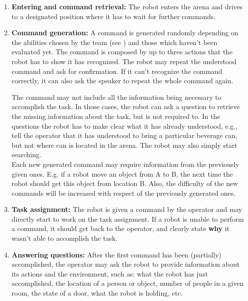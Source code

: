 \begin{enumerate}
	\item \textbf{Entering and command retrieval:} The robot enters the arena and drives to a designated position where it has to wait for further commands. \\

	\item \textbf{Command generation:} A command is generated randomly depending on the abilities chosen by the team (see ) and those which haven't been evaluated yet. The command is composed by up to three actions that the robot has to show it has recognized. The robot may repeat the understood command and ask for confirmation. If it can't recognize the command correctly, it can also ask the speaker to repeat the whole command again.

	The command may not include all the information being necessary to accomplish the task. In those cases, the robot can ask a question to retrieve the missing information about the task, but is not required to. In the questions the robot has to make clear what it has already understood, e.g., tell the operator that it has understood to bring a particular beverage can, but not where can is located in the arena. The robot may also simply start searching. \\

	Each new generated command may require information from the previously given ones. E.g. if a robot move an object from A to B, the next time the robot should get this object from location B. 
	Also, the difficulty of the new commands will be increased with respect of the previously generated ones. \\

	\item \textbf{Task assignment:} The robot is given a command by the operator and may directly start to work on the task assignment. If a robot is unable to perform a command, it should get back to the operator, and clearly state \textbf{why} it wasn't able to accomplish the task. \\

	\item \textbf{Answering questions:} After the first command has been (partially) accomplished, the operator may ask the robot to provide information about its actions and the environment, such as: what the robot has just accomplished, the location of a person or object, number of people in a given room, the state of a door, what the robot is holding, etc. \\


\end{enumerate}
